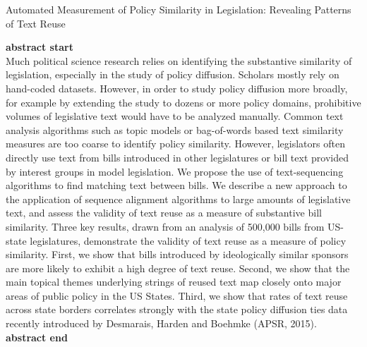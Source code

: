 \documentclass[12pt]{article} %
\begin{document}
 

\begin{center}
    \begin{Large}
    Automated Measurement of Policy Similarity in Legislation: Revealing Patterns of Text Reuse
    \end{Large}

\end{center}

{\bf abstract start} \\
Much political science research relies on identifying the substantive similarity of legislation, especially in the study of policy diffusion. Scholars mostly rely on hand-coded datasets. However, in order to study policy diffusion more broadly, for example by extending the study to dozens or more policy domains, prohibitive volumes of legislative text would have to be analyzed manually. Common text analysis algorithms such as topic models or bag-of-words based text similarity measures are too coarse to identify policy similarity. However, legislators often directly use text from bills introduced in other legislatures or bill text provided by interest groups in model legislation. We propose the use of text-sequencing algorithms to find matching text between bills. We describe a new approach to the application of sequence alignment algorithms to large amounts of legislative text, and assess the validity of text reuse as a measure of substantive bill similarity. Three key results, drawn from an analysis of 500,000 bills from US-state legislatures, demonstrate the validity of text reuse as a measure of policy similarity. First, we show that bills introduced by ideologically similar sponsors are more likely to exhibit a high degree of text reuse. Second, we show that the main topical themes underlying strings of reused text map closely onto major areas of public policy in the US States. Third, we show that rates of text reuse across state borders correlates strongly with the state policy diffusion ties data recently introduced by Desmarais, Harden and Boehmke (APSR, 2015).  \\
{\bf abstract end}
\end{document}
